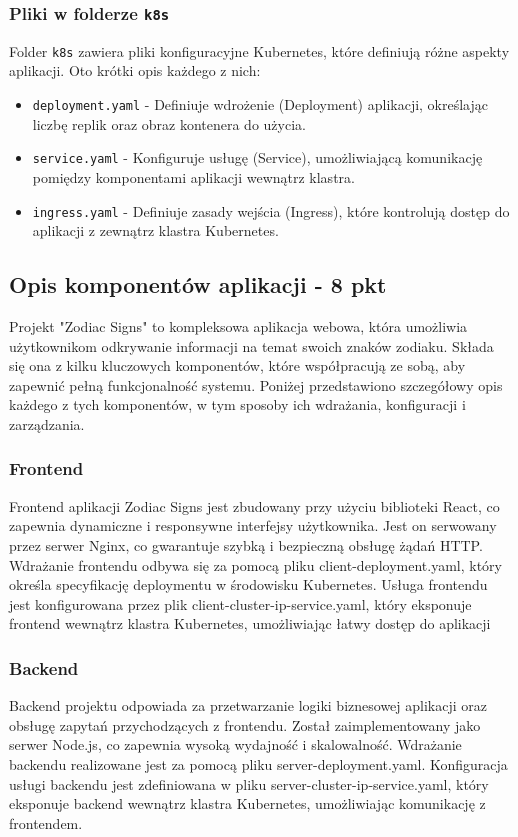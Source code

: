 \documentclass[12pt,a4paper]{article}
\begin{document}
\subsubsection{Pliki w folderze \texttt{k8s}}
Folder \texttt{k8s} zawiera pliki konfiguracyjne Kubernetes, które definiują różne aspekty aplikacji. Oto krótki opis każdego z nich:

\begin{itemize}
    \item \texttt{deployment.yaml} - Definiuje wdrożenie (Deployment) aplikacji, określając liczbę replik oraz obraz kontenera do użycia.
    \item \texttt{service.yaml} - Konfiguruje usługę (Service), umożliwiającą komunikację pomiędzy komponentami aplikacji wewnątrz klastra.
    \item \texttt{ingress.yaml} - Definiuje zasady wejścia (Ingress), które kontrolują dostęp do aplikacji z zewnątrz klastra Kubernetes.
\end{itemize}

\subsection{Opis komponentów aplikacji - 8 pkt}
\label{sec:FunctionalConditions}
Projekt "Zodiac Signs" to kompleksowa aplikacja webowa, która umożliwia użytkownikom odkrywanie informacji na temat swoich znaków zodiaku. Składa się ona z kilku kluczowych komponentów, które współpracują ze sobą, aby zapewnić pełną funkcjonalność systemu. Poniżej przedstawiono szczegółowy opis każdego z tych komponentów, w tym sposoby ich wdrażania, konfiguracji i zarządzania.

\subsubsection{Frontend}
Frontend aplikacji Zodiac Signs jest zbudowany przy użyciu biblioteki React, co zapewnia dynamiczne i responsywne interfejsy użytkownika. Jest on serwowany przez serwer Nginx, co gwarantuje szybką i bezpieczną obsługę żądań HTTP. Wdrażanie frontendu odbywa się za pomocą pliku client-deployment.yaml, który określa specyfikację deploymentu w środowisku Kubernetes. Usługa frontendu jest konfigurowana przez plik client-cluster-ip-service.yaml, który eksponuje frontend wewnątrz klastra Kubernetes, umożliwiając łatwy dostęp do aplikacji

\subsubsection{Backend}
Backend projektu odpowiada za przetwarzanie logiki biznesowej aplikacji oraz obsługę zapytań przychodzących z frontendu. Został zaimplementowany jako serwer Node.js, co zapewnia wysoką wydajność i skalowalność. Wdrażanie backendu realizowane jest za pomocą pliku server-deployment.yaml. Konfiguracja usługi backendu jest zdefiniowana w pliku server-cluster-ip-service.yaml, który eksponuje backend wewnątrz klastra Kubernetes, umożliwiając komunikację z frontendem.
\end{document}
